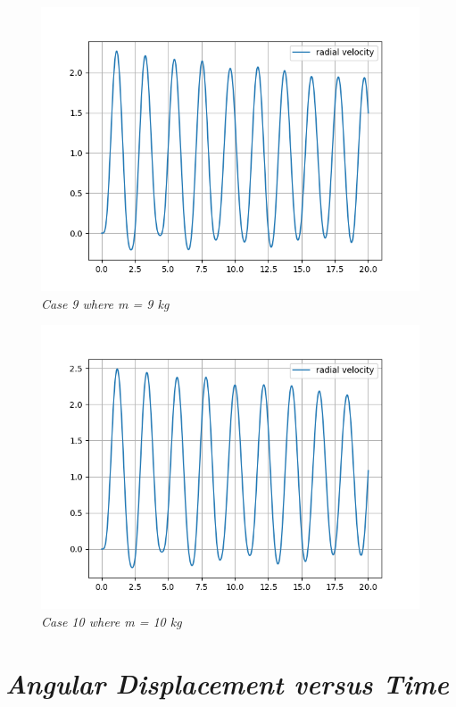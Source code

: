         \begin{figure}[H]
            \centering
            \includegraphics{Appendix/RSimPictures/R/rm9.png}
            \caption{\textit{Case 9 where m = 9 kg}}
            \label{}
        \end{figure}
            
        \begin{figure}[H]
            \centering
            \includegraphics{Appendix/RSimPictures/R/rm10.png}
            \caption{\textit{Case 10 where m = 10 kg}}
            \label{}
        \end{figure}
            
    \section{\textit{Angular Displacement versus Time}}
            

